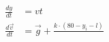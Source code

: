 \documentclass[preview]{standalone}
\begin{document}
\begin{align*}
\quad\\
            \frac{dy}{dt}&=vt     \quad\\
            \frac{d\vec{v}}{dt}&=\vec{g}+\frac{k\cdot(80-y_i-l)}{}
\end{align*}
\end{document}

